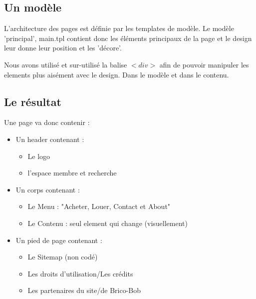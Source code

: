 
\subsection{Un modèle}
L'architecture des pages est définie par les templates de modèle.
Le modèle 'principal', main.tpl contient donc les éléments principaux de la page et le design leur donne leur position et les 'décore'.

Nous avons utilisé et sur-utilisé la balise $<div>$ afin de pouvoir manipuler les elements plus aisément avec le design. Dans le modèle et dans le contenu.

\subsection{Le résultat}
Une page va donc contenir :
\begin{itemize}
	\item Un header contenant :
		\begin{itemize}
			\item Le logo
			\item l'espace membre et recherche		
		\end{itemize}
	\item Un corps contenant :
		\begin{itemize}
			\item Le Menu : "Acheter, Louer, Contact et About"
			\item Le Contenu : seul element qui change (visuellement)	
		\end{itemize}
	\item Un pied de page contenant :
		\begin{itemize}
			\item Le Sitemap (non codé)
			\item Les droits d'utilisation/Les crédits
			\item Les partenaires du site/de Brico-Bob
		\end{itemize}
\end{itemize}




